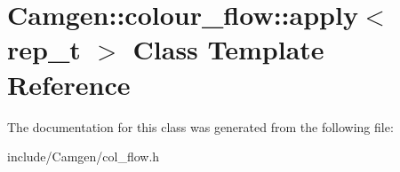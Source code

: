 \hypertarget{a00012}{\section{Camgen\-:\-:colour\-\_\-flow\-:\-:apply$<$ rep\-\_\-t $>$ Class Template Reference}
\label{a00012}
}


The documentation for this class was generated from the following file\-:\begin{DoxyCompactItemize}
\item 
include/\-Camgen/col\-\_\-flow.\-h\end{DoxyCompactItemize}
